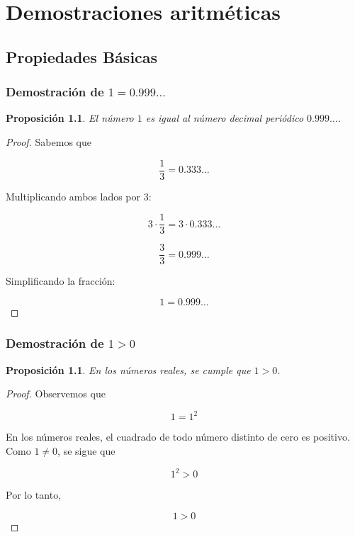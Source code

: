 \documentclass[12pt,final]{report}
\theoremstyle{plain}
\newtheorem{proposition}[theorem]{Proposición}
\theoremstyle{definition}
\begin{document}
\newpage


\chapter{Demostraciones aritméticas}

\section{Propiedades Básicas}

\subsection{Demostración de $1 = 0.999\ldots$}

\begin{proposition}
El número $1$ es igual al número decimal periódico $0.999\ldots$.
\end{proposition}

\begin{proof}

Sabemos que

\[
\frac{1}{3} = 0.333\ldots
\]

Multiplicando ambos lados por $3$:

\[
3 \cdot \frac{1}{3} = 3 \cdot 0.333\ldots
\]

\[
\frac{3}{3} = 0.999\ldots
\]

Simplificando la fracción:

\[
1 = 0.999\ldots
\]

\end{proof}

\newpage

\subsection{Demostración de $1>0$}

\begin{proposition}
En los números reales, se cumple que $1>0$.
\end{proposition}

\begin{proof}

Observemos que

\[
1 = 1^2
\]

En los números reales, el cuadrado de todo número distinto de cero es positivo. Como $1 \neq 0$, se sigue que

\[
1^2 > 0
\]

Por lo tanto,

\[
1 > 0
\]

\end{proof}
\end{document}
